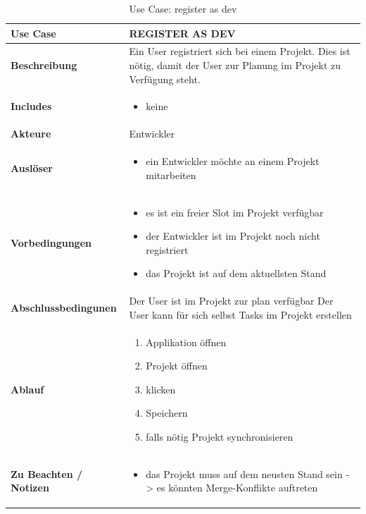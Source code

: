    \begin{table}[H]
    \centering
    \settowidth{}
    \setlength\extrarowheight{2pt}
    \begin{tabulary}{1.0\textwidth}{|m{4cm}|m{9cm}|}
      \hline
      \textbf{Use Case} &
      \textbf{REGISTER AS DEV}\\
      \hline
      \textbf{Beschreibung} &
      Ein User registriert sich bei einem Projekt.
      Dies ist nötig, damit der User zur Planung im Projekt zu Verfügung steht.\\ 
      \hline
      \textbf{Includes} &
      \begin{itemize}
       \item keine
        \end{itemize}\\ 
        \hline 
      \textbf{Akteure} &
      Entwickler\\ 
      \hline
      \textbf{Auslöser} &
      \begin{itemize}
        \item ein Entwickler möchte an einem Projekt mitarbeiten
         \end{itemize}\\  
      \hline
      \textbf{Vorbedingungen} &
      \begin{itemize}
        \item es ist ein freier Slot im Projekt verfügbar
        \item der Entwickler ist im Projekt noch nicht registriert
        \item das Projekt ist auf dem aktuellsten Stand
      \end{itemize}\\  
      \hline
      \textbf{Abschlussbedingunen} &
      Der User ist im Projekt zur plan verfügbar 
      Der User kann für sich selbst Tasks im Projekt erstellen\\
      \hline
      \textbf{Ablauf} &
      \begin{enumerate}
        \item Applikation öffnen
        \item Projekt öffnen
        \item <Als Entwickler Registrieren> klicken
        \item Speichern
        \item falls nötig Projekt synchronisieren
        \end{enumerate}\\ 
      \hline
      \textbf{Zu Beachten / Notizen} &
      \begin{itemize}
        \item das Projekt muss auf dem neusten Stand sein -> es könnten Merge-Konflikte auftreten
        \end{itemize}\\ 
      \hline
    \end{tabulary}
    \caption{Use Case: register as dev}
  \end{table}
